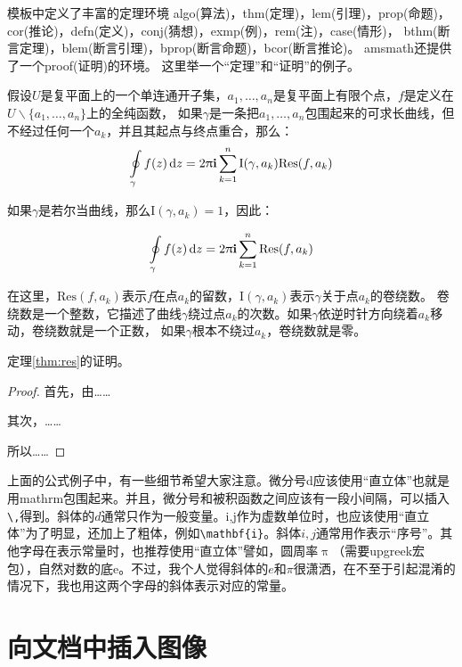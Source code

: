 模板中定义了丰富的定理环境
algo(算法)，thm(定理)，lem(引理)，prop(命题)，cor(推论)，defn(定义)，conj(猜想)，exmp(例)，rem(注)，case(情形)，
bthm(断言定理)，blem(断言引理)，bprop(断言命题)，bcor(断言推论)。
amsmath还提供了一个proof(证明)的环境。
这里举一个“定理”和“证明”的例子。
\begin{thm}[留数定理]
\label{thm:res}
  假设$U$是复平面上的一个单连通开子集，$a_1,\ldots,a_n$是复平面上有限个点，$f$是定义在$U\backslash \{a_1,\ldots,a_n\}$上的全纯函数，
  如果$\gamma$是一条把$a_1,\ldots,a_n$包围起来的可求长曲线，但不经过任何一个$a_k$，并且其起点与终点重合，那么：
  \begin{equation}
    \label{eq:res}
    \ointop_{\gamma}f(z)\,\mathrm{d}z = 2\uppi\mathbf{i}\sum^n_{k=1}\mathrm{I}(\gamma,a_k)\mathrm{Res}(f,a_k)
  \end{equation}

  如果$\gamma$是若尔当曲线，那么$\mathrm{I}(\gamma, a_k)=1$，因此：

  \begin{equation}
    \label{eq:resthm}
    \ointop_{\gamma}f(z)\,\mathrm{d}z = 2\uppi\mathbf{i}\sum^n_{k=1}\mathrm{Res}(f,a_k)
  \end{equation}

  在这里，$\mathrm{Res}(f, a_k)$表示$f$在点$a_k$的留数，$\mathrm{I}(\gamma,a_k)$表示$\gamma$关于点$a_k$的卷绕数。
  卷绕数是一个整数，它描述了曲线$\gamma$绕过点$a_k$的次数。如果$\gamma$依逆时针方向绕着$a_k$移动，卷绕数就是一个正数，
  如果$\gamma$根本不绕过$a_k$，卷绕数就是零。

  定理\ref{thm:res}的证明。
  \begin{proof}
    首先，由……

    其次，……

    所以……
  \end{proof}
\end{thm}

上面的公式例子中，有一些细节希望大家注意。微分号d应该使用“直立体”也就是用mathrm包围起来。并且，微分号和被积函数之间应该有一段小间隔，可以插入\verb+\,+得到。斜体的$d$通常只作为一般变量。i,j作为虚数单位时，也应该使用“直立体”为了明显，还加上了粗体，例如\verb+\mathbf{i}+。斜体$i,j$通常用作表示“序号”。其他字母在表示常量时，也推荐使用“直立体”譬如，圆周率$\uppi$（需要upgreek宏包），自然对数的底$\mathrm{e}$。不过，我个人觉得斜体的$e$和$\pi$很潇洒，在不至于引起混淆的情况下，我也用这两个字母的斜体表示对应的常量。

\section{向文档中插入图像}
\label{sec:insertimage}

